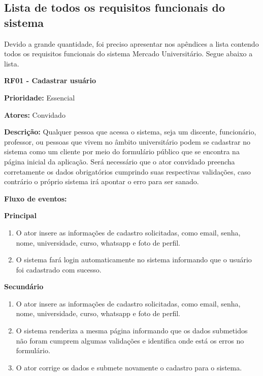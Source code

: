 
\begin{apendicesenv}

\partapendices

\chapter{Lista de todos os requisitos funcionais do sistema}

Devido a grande quantidade, foi preciso apresentar nos apêndices a lista contendo todos os requisitos funcionais do sistema Mercado Universitário. Segue abaixo a lista.

\textbf{RF01 - Cadastrar usuário} \par
\textbf{Prioridade:} Essencial \par
\textbf{Atores:} Convidado \par
\textbf{Descrição:} Qualquer pessoa que acessa o sistema, seja um discente, funcionário, professor, ou pessoas que vivem no âmbito universitário podem se cadastrar no sistema como um cliente por meio do formulário público que se encontra na página inicial da aplicação. Será necessário que o ator convidado preencha corretamente os dados obrigatórios cumprindo suas respectivas validações, caso contrário o próprio sistema irá apontar o erro para ser sanado. \par
\textbf{Fluxo de eventos:} \par
\textbf{Principal} \par
\begin{enumerate}
  \item O ator insere as informações de cadastro solicitadas, como email, senha, nome, universidade, curso, whatsapp e foto de perfil.
  \item O sistema fará login automaticamente no sistema informando que o usuário foi cadastrado com sucesso.
\end{enumerate} \par
\textbf{Secundário} \par
\begin{enumerate}
  \item O ator insere as informações de cadastro solicitadas, como email, senha, nome, universidade, curso, whatsapp e foto de perfil.
  \item O sistema renderiza a mesma página informando que os dados submetidos não foram cumprem algumas validações e identifica onde está os erros no formulário.
  \item O ator corrige os dados e submete novamente o cadastro para o sistema.
\end{enumerate}


\end{apendicesenv}
